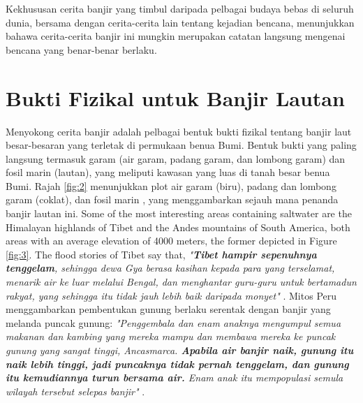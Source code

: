 \documentclass[10pt,twocolumn,letterpaper]{article}
\begin{document}
Kekhususan cerita banjir yang timbul daripada pelbagai budaya bebas di seluruh dunia, bersama dengan cerita-cerita lain tentang kejadian bencana, menunjukkan bahawa cerita-cerita banjir ini mungkin merupakan catatan langsung mengenai bencana yang benar-benar berlaku.

\section{Bukti Fizikal untuk Banjir Lautan}

Menyokong cerita banjir adalah pelbagai bentuk bukti fizikal tentang banjir laut besar-besaran yang terletak di permukaan benua Bumi. Bentuk bukti yang paling langsung termasuk garam (air garam, padang garam, dan lombong garam) dan fosil marin (lautan), yang meliputi kawasan yang luas di tanah besar benua Bumi. Rajah \ref{fig:2} menunjukkan plot air garam (biru), padang dan lombong garam (coklat), dan fosil marin \cite{15,16,86,87}, yang menggambarkan sejauh mana penanda banjir lautan ini.
Some of the most interesting areas containing saltwater are the Himalayan highlands of Tibet and the Andes mountains of South America, both areas with an average elevation of 4000 meters, the former depicted in Figure \ref{fig:3}. The flood stories of Tibet say that, \textit{"\textbf{Tibet hampir sepenuhnya tenggelam}, sehingga dewa Gya berasa kasihan kepada para yang terselamat, menarik air ke luar melalui Bengal, dan menghantar guru-guru untuk bertamadun rakyat, yang sehingga itu tidak jauh lebih baik daripada monyet"} \cite{3}. Mitos Peru menggambarkan pembentukan gunung berlaku serentak dengan banjir yang melanda puncak gunung: \textit{"Penggembala dan enam anaknya mengumpul semua makanan dan kambing yang mereka mampu dan membawa mereka ke puncak gunung yang sangat tinggi, Ancasmarca. \textbf{Apabila air banjir naik, gunung itu naik lebih tinggi, jadi puncaknya tidak pernah tenggelam, dan gunung itu kemudiannya turun bersama air.} Enam anak itu mempopulasi semula wilayah tersebut selepas banjir"} \cite{3}.
\end{document}
